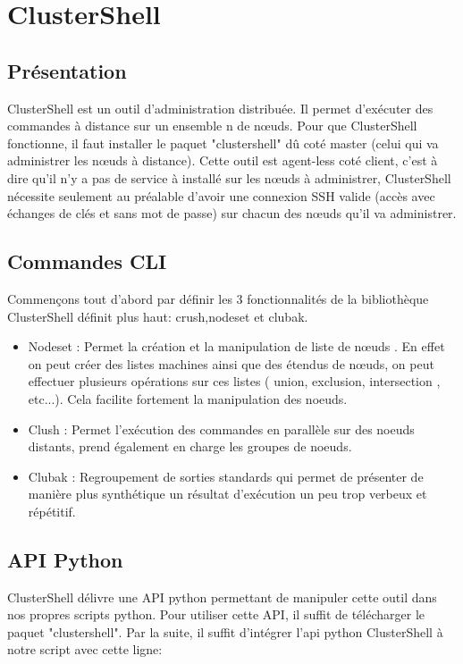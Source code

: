 \documentclass[a4paper,11pt]{article}
\begin{document}
\section{ClusterShell}
\label{sec:section2}
\subsection{Présentation}
\label{sub:2.1}
\noindent
ClusterShell est un outil d'administration distribuée. Il permet d'exécuter des commandes à distance sur un ensemble n de nœuds. 
\smallbreak
\noindent
Pour que ClusterShell fonctionne, il faut installer le paquet "clustershell" dû coté master (celui qui va administrer les nœuds à distance).
Cette outil est agent-less coté client, c'est à dire qu'il n'y a pas de service à installé sur les nœuds à administrer, ClusterShell nécessite seulement au préalable d'avoir une connexion SSH valide (accès avec échanges de clés et sans mot de passe) sur chacun des nœuds qu'il va administrer.

\subsection{Commandes CLI}
\label{sub:2.2}
Commençons tout d'abord par définir les 3 fonctionnalités de la bibliothèque ClusterShell définit plus haut: crush,nodeset et clubak.
\begin{itemize}
\item Nodeset : Permet la création et la manipulation de liste de nœuds . En effet on peut créer des listes machines ainsi que des étendus de nœuds, on peut effectuer plusieurs opérations sur ces listes ( union, exclusion, intersection , etc...). Cela facilite fortement la manipulation des noeuds.
\item Clush : Permet l'exécution des commandes en parallèle sur des noeuds distants, prend également en charge les groupes de noeuds.
\item Clubak : Regroupement de sorties standards qui permet de présenter de manière plus synthétique un résultat d'exécution un peu trop verbeux et répétitif.
\end{itemize}

\subsection{API Python}
\label{sub:2.3}
ClusterShell délivre une API python permettant de manipuler cette outil dans nos propres scripts python.
\smallbreak
Pour utiliser cette API, il suffit de télécharger le paquet "clustershell".
\smallbreak
Par la suite, il suffit d'intégrer l'api python ClusterShell à notre script avec cette ligne:
\end{document}

